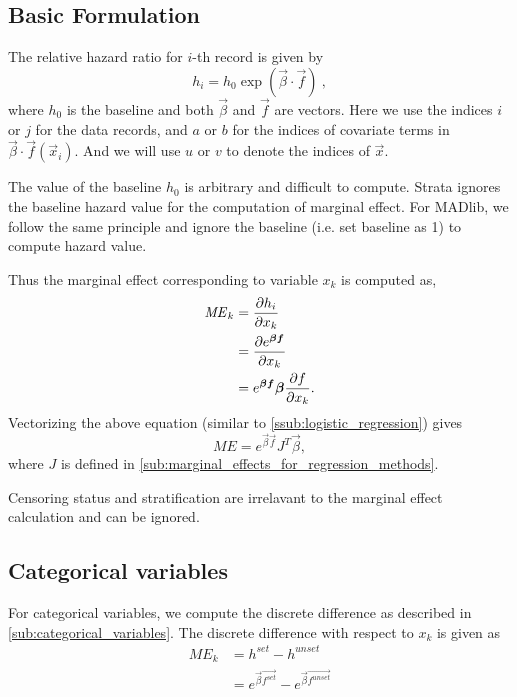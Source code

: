 \subsection{Basic Formulation}

The relative hazard ratio for $i$-th record is given by
\begin{equation}
    h_i = h_0 \exp \left( \vec{\beta}\cdot\vec{f} \right)\ ,
\end{equation}
where $h_0$ is the baseline and both $\vec{\beta}$ and
$\vec{f}$ are vectors.  Here we use the indices
$i$ or $j$ for the data records, and $a$ or $b$ for the indices of
covariate terms in $\vec{\beta}\cdot \vec{f}(\vec{x}_i)$. And we will use
$u$ or $v$ to denote the indices of $\vec{x}$.

The value of the baseline $h_0$ is arbitrary and difficult to compute. Strata
ignores the baseline hazard value for the computation of marginal effect. For
MADlib, we follow the same principle and ignore the baseline (i.e. set baseline
as 1) to compute hazard value.

Thus the marginal effect corresponding to variable $x_k$ is computed as,
\begin{align*} \label{eq:me1}
    \mathit{ME}_{k} & = \pder[h_i]{x_k} \\
           & =  \pder[e^{\vec{\beta} \vec{f}}]{x_k} \\
           & = e^{\vec{\beta} \vec{f}} \vec{\beta} \pder[f]{x_k}.
\end{align*}
Vectorizing the above equation (similar to \ref{ssub:logistic_regression}) gives
\begin{equation*}
  \mathit{ME} = e^{\vec{\beta} \vec{f}} J^T \vec{\beta},
 \end{equation*}
where $J$ is defined in \ref{sub:marginal_effects_for_regression_methods}.


Censoring status and stratification are irrelavant to the marginal effect
calculation and can be ignored.

\subsection{Categorical variables}

For categorical variables, we compute the discrete difference as described in
\ref{sub:categorical_variables}.
The discrete difference with respect to $x_k$ is given as
\begin{align*}
    \mathit{ME_k} &= h^{set} - h^{unset} \\
                  &= e^{\vec{\beta}\vec{f^{set}}} - e^{\vec{\beta}\vec{f^{unset}}}
\end{align*}

